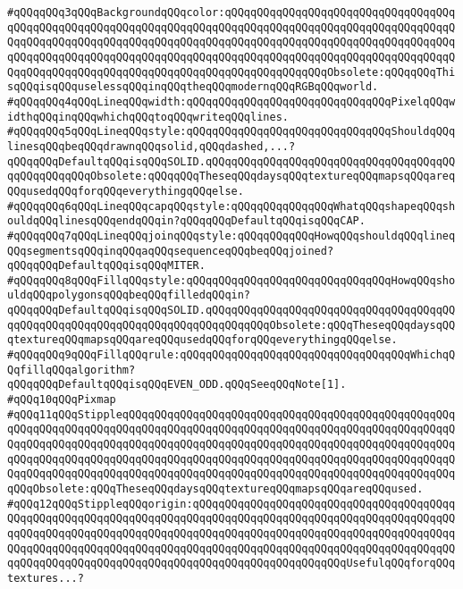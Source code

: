 \verb|#qQQqqQQq3qQQqBackgroundqQQqcolor:qQQqqQQqqQQqqQQqqQQqqQQqqQQqqQQqqQQqqQQqqQQqqQQqqQQqqQQqqQQqqQQqqQQqqQQqqQQqqQQqqQQqqQQqqQQqqQQqqQQqqQQqqQQqqQQqqQQqqQQqqQQqqQQqqQQqqQQqqQQqqQQqqQQqqQQqqQQqqQQqqQQqqQQqqQQqqQQqqQQqqQQqqQQqqQQqqQQqqQQqqQQqqQQqqQQqqQQqqQQqqQQqqQQqqQQqqQQqqQQqqQQqqQQqqQQqqQQqqQQqqQQqqQQqqQQqqQQqqQQqqQQqqQQqqQQqqQQqObsolete:qQQqqQQqThisqQQqisqQQquselessqQQqinqQQqtheqQQqmodernqQQqRGBqQQqworld.|\newline
\verb|#qQQqqQQq4qQQqLineqQQqwidth:qQQqqQQqqQQqqQQqqQQqqQQqqQQqqQQqPixelqQQqwidthqQQqinqQQqwhichqQQqtoqQQqwriteqQQqlines.|\newline
\verb|#qQQqqQQq5qQQqLineqQQqstyle:qQQqqQQqqQQqqQQqqQQqqQQqqQQqqQQqShouldqQQqlinesqQQqbeqQQqdrawnqQQqsolid,qQQqdashed,...?qQQqqQQqDefaultqQQqisqQQqSOLID.qQQqqQQqqQQqqQQqqQQqqQQqqQQqqQQqqQQqqQQqqQQqqQQqqQQqObsolete:qQQqqQQqTheseqQQqdaysqQQqtextureqQQqmapsqQQqareqQQqusedqQQqforqQQqeverythingqQQqelse.|\newline
\verb|#qQQqqQQq6qQQqLineqQQqcapqQQqstyle:qQQqqQQqqQQqqQQqWhatqQQqshapeqQQqshouldqQQqlinesqQQqendqQQqin?qQQqqQQqDefaultqQQqisqQQqCAP.|\newline
\verb|#qQQqqQQq7qQQqLineqQQqjoinqQQqstyle:qQQqqQQqqQQqHowqQQqshouldqQQqlineqQQqsegmentsqQQqinqQQqaqQQqsequenceqQQqbeqQQqjoined?qQQqqQQqDefaultqQQqisqQQqMITER.|\newline
\verb|#qQQqqQQq8qQQqFillqQQqstyle:qQQqqQQqqQQqqQQqqQQqqQQqqQQqqQQqHowqQQqshouldqQQqpolygonsqQQqbeqQQqfilledqQQqin?qQQqqQQqDefaultqQQqisqQQqSOLID.qQQqqQQqqQQqqQQqqQQqqQQqqQQqqQQqqQQqqQQqqQQqqQQqqQQqqQQqqQQqqQQqqQQqqQQqqQQqqQQqObsolete:qQQqTheseqQQqdaysqQQqtextureqQQqmapsqQQqareqQQqusedqQQqforqQQqeverythingqQQqelse.|\newline
\verb|#qQQqqQQq9qQQqFillqQQqrule:qQQqqQQqqQQqqQQqqQQqqQQqqQQqqQQqqQQqWhichqQQqfillqQQqalgorithm?qQQqqQQqDefaultqQQqisqQQqEVEN_ODD.qQQqSeeqQQqNote[1].|\newline
\verb|#qQQq10qQQqPixmap|\newline
\verb|#qQQq11qQQqStippleqQQqqQQqqQQqqQQqqQQqqQQqqQQqqQQqqQQqqQQqqQQqqQQqqQQqqQQqqQQqqQQqqQQqqQQqqQQqqQQqqQQqqQQqqQQqqQQqqQQqqQQqqQQqqQQqqQQqqQQqqQQqqQQqqQQqqQQqqQQqqQQqqQQqqQQqqQQqqQQqqQQqqQQqqQQqqQQqqQQqqQQqqQQqqQQqqQQqqQQqqQQqqQQqqQQqqQQqqQQqqQQqqQQqqQQqqQQqqQQqqQQqqQQqqQQqqQQqqQQqqQQqqQQqqQQqqQQqqQQqqQQqqQQqqQQqqQQqqQQqqQQqqQQqqQQqqQQqqQQqqQQqqQQqqQQqqQQqObsolete:qQQqTheseqQQqdaysqQQqtextureqQQqmapsqQQqareqQQqused.|\newline
\verb|#qQQq12qQQqStippleqQQqorigin:qQQqqQQqqQQqqQQqqQQqqQQqqQQqqQQqqQQqqQQqqQQqqQQqqQQqqQQqqQQqqQQqqQQqqQQqqQQqqQQqqQQqqQQqqQQqqQQqqQQqqQQqqQQqqQQqqQQqqQQqqQQqqQQqqQQqqQQqqQQqqQQqqQQqqQQqqQQqqQQqqQQqqQQqqQQqqQQqqQQqqQQqqQQqqQQqqQQqqQQqqQQqqQQqqQQqqQQqqQQqqQQqqQQqqQQqqQQqqQQqqQQqqQQqqQQqqQQqqQQqqQQqqQQqqQQqqQQqqQQqqQQqqQQqqQQqqQQqqQQqqQQqUsefulqQQqforqQQqtextures...?|\newline
